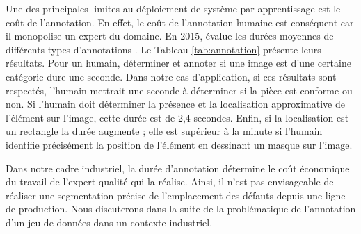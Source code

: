 Une des principales limites au déploiement de système par apprentissage est le coût de l'annotation.
En effet, le coût de l'annotation humaine est conséquent car il monopolise un expert du domaine.
En 2015, \citeauthor{bearman_what_2015} évalue les durées moyennes de différents types d'annotations \cite{bearman_what_2015}.
Le Tableau \ref{tab:annotation} présente leurs résultats.
Pour un humain, déterminer et annoter si une image est d'une certaine catégorie dure une seconde.
Dans notre cas d'application, si ces résultats sont respectés, l'humain mettrait une seconde à déterminer si la pièce est conforme ou non.
Si l'humain doit déterminer la présence et la localisation approximative de l'élément sur l'image, cette durée est de 2,4 secondes.
Enfin, si la localisation est un rectangle la durée augmente ; elle est supérieur à la minute si l'humain identifie précisément la position de l'élément en dessinant un masque sur l'image.

Dans notre cadre industriel, la durée d'annotation détermine le coût économique du travail de l'expert qualité qui la réalise.
Ainsi, il n'est pas envisageable de réaliser une segmentation précise de l'emplacement des défauts depuis une ligne de production.
Nous discuterons dans la suite de la problématique de l'annotation d'un jeu de données dans un contexte industriel.


